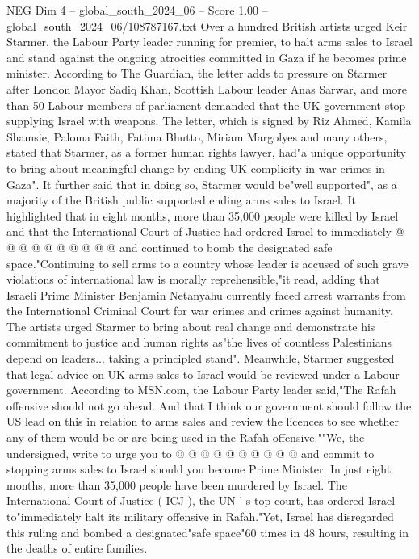 \begin{textsample}{NEG Dim 4 – global\_south\_2024\_06 – Score 1.00 – global\_south\_2024\_06/108787167.txt}  \label{ex:f4_neg_374}
Over a hundred British artists urged Keir Starmer, the Labour Party leader running for premier, to halt arms sales to Israel and stand against the ongoing atrocities committed in Gaza if he becomes prime minister.
According to The Guardian, the letter adds to pressure on Starmer after London Mayor Sadiq Khan, Scottish Labour leader Anas Sarwar, and more than 50 Labour members of parliament demanded that the UK government stop supplying Israel with weapons.
The letter, which is signed by Riz Ahmed, Kamila Shamsie, Paloma Faith, Fatima Bhutto, Miriam Margolyes and many others, stated that Starmer, as a former human rights lawyer, had"a unique opportunity to bring about meaningful change by ending UK complicity in war crimes in Gaza".
It further said that in doing so, Starmer would be"well supported", as a majority of the British public supported ending arms sales to Israel.
It highlighted that in eight months, more than 35,000 people were killed by Israel and that the International Court of Justice had ordered Israel to immediately @ @ @ @ @ @ @ @ @ @ and continued to bomb the designated safe space."Continuing to sell arms to a country whose leader is accused of such grave violations of international law is morally reprehensible,"it read, adding that Israeli Prime Minister Benjamin Netanyahu currently faced arrest warrants from the International Criminal Court for war crimes and crimes against humanity.
The artists urged Starmer to bring about real change and demonstrate his commitment to justice and human rights as"the lives of countless Palestinians depend on leaders... taking a principled stand".
Meanwhile, Starmer suggested that legal advice on UK arms sales to Israel would be reviewed under a Labour government.
According to MSN.com, the Labour Party leader said,"The Rafah offensive should not go ahead.
And that I think our government should follow the US lead on this in relation to arms sales and review the licences to see whether any of them would be or are being used in the Rafah offensive.""We, the undersigned, write to urge you to @ @ @ @ @ @ @ @ @ @ and commit to stopping arms sales to Israel should you become Prime Minister.
In just eight months, more than 35,000 people have been murdered by Israel.
The International Court of Justice ( ICJ ), the UN ' s top court, has ordered Israel to"immediately halt its military offensive in Rafah."Yet, Israel has disregarded this ruling and bombed a designated"safe space"60 times in 48 hours, resulting in the deaths of entire families.

\end{textsample}
